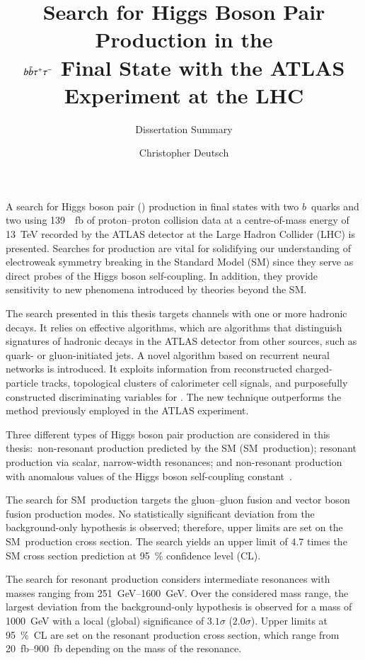 \documentclass[fontsize=11pt, paper=a4]{scrartcl}
\title{Search for Higgs Boson Pair Production in the\\$b\bar{b}\tau^{+} \tau^{-}$ Final State
  with the ATLAS\\Experiment at the LHC}
\subtitle{Dissertation Summary}
\author{Christopher Deutsch}
\date{}
\begin{document}
\maketitle
\thispagestyle{empty}

\noindent A search for Higgs boson pair (\HH) production in final states with
two $b$~quarks and two \tauleptons using \SI{139}{\per\femto\barn} of
proton--proton collision data at a centre-of-mass energy of \SI{13}{\TeV}
recorded by the ATLAS detector at the Large Hadron Collider (LHC) is
presented. Searches for \HH production are vital for solidifying our
understanding of electroweak symmetry breaking in the Standard Model (SM) since
they serve as direct probes of the Higgs boson self-coupling. In addition, they
provide sensitivity to new phenomena introduced by theories beyond the SM.

The search presented in this thesis targets channels with one or more hadronic
\tauleptonC decays. It relies on effective \tauid algorithms, which are
algorithms that distinguish signatures of hadronic \tauleptonC decays in the
ATLAS detector from other sources, such as quark- or gluon-initiated jets. A
novel \tauid algorithm based on recurrent neural networks is introduced. It
exploits information from reconstructed charged-particle tracks, topological
clusters of calorimeter cell signals, and purposefully constructed
discriminating variables for \tauid. The new technique outperforms the method
previously employed in the ATLAS experiment.

Three different types of Higgs boson pair production are considered in this
thesis:~non-resonant \HH production predicted by the SM (SM~\HH production);
resonant \HH production via scalar, narrow-width resonances; and non-resonant
\HH production with anomalous values of the Higgs boson self-coupling
constant~\lambdahhh.

The search for SM~\HH production targets the gluon--gluon fusion and vector
boson fusion production modes. No statistically significant deviation from the
background-only hypothesis is observed; therefore, upper limits are set on the
SM~\HH production cross section. The search yields an upper limit of $4.7$ times
the SM cross section prediction at \SI{95}{\percent} confidence level (CL).

The search for resonant \HH production considers intermediate resonances with
masses ranging from \SIrange{251}{1600}{\GeV}. Over the considered mass range,
the largest deviation from the background-only hypothesis is observed for a mass
of \SI{1000}{\GeV} with a local (global) significance of $3.1\sigma$
($2.0\sigma$). Upper limits at \SI{95}{\percent}~CL are set on the resonant \HH
production cross section, which range from \SIrange{20}{900}{\femto\barn}
depending on the mass of the resonance.
\end{document}
